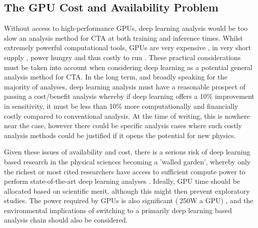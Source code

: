 \subsection{The GPU Cost and Availability Problem}
Without access to high-performance GPUs, deep learning analysis would be too slow an analysis method for CTA at both training and inference times. Whilst extremely powerful computational tools, GPUs are very expensive \cite{gpucost}, in very short supply \cite{gpushort}, power hungry \cite{2080ti} and thus costly to run \cite{2080ti}. These practical considerations must be taken into account when considering deep learning as a potential general analysis method for CTA. In the long term, and broadly speaking for the majority of analyses, deep learning analysis must have a reasonable prospect of passing a cost/benefit analysis whereby if deep learning offers a 10\% improvement in sensitivity, it must be less than 10\% more computationally and financially costly compared to conventional analysis. At the time of writing, this is nowhere near the case, however there could be specific analysis cases where such costly analysis methods could be justified if it opens the potential for new physics.

Given these issues of availability and cost, there is a serious risk of deep learning based research in the physical sciences becoming a 'walled garden', whereby only the richest or most cited researchers have access to sufficient compute power to perform state-of-the-art deep learning analyses \cite{gpudivide}. Ideally, GPU time should be allocated based on scientific merit, although this might then prevent exploratory studies. The power required by GPUs is also significant ($~$250W a GPU) \cite{2080ti}, and the environmental implications of switching to a primarily deep learning based analysis chain should also be considered.
